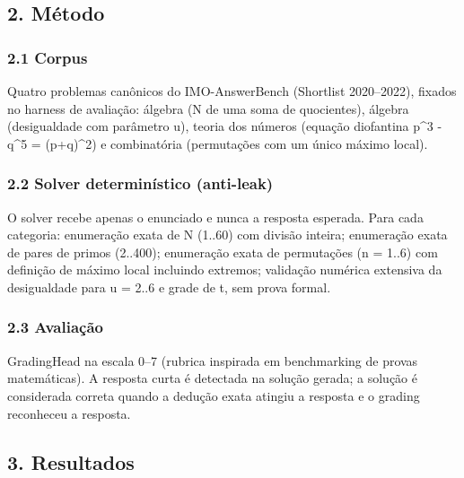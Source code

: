 \documentclass[11pt,a4paper]{article}
\begin{document}
\subsection{2. Método}\label{muxe9todo}

\subsubsection{2.1 Corpus}\label{corpus}

Quatro problemas canônicos do IMO-AnswerBench (Shortlist 2020--2022),
fixados no harness de avaliação: álgebra (N de uma soma de quocientes),
álgebra (desigualdade com parâmetro u), teoria dos números (equação
diofantina p\^{}3 - q\^{}5 = (p+q)\^{}2) e combinatória (permutações com
um único máximo local).

\subsubsection{2.2 Solver determinístico
(anti-leak)}\label{solver-determinuxedstico-anti-leak}

O solver recebe apenas o enunciado e nunca a resposta esperada. Para
cada categoria: enumeração exata de N (1..60) com divisão inteira;
enumeração exata de pares de primos (2..400); enumeração exata de
permutações (n = 1..6) com definição de máximo local incluindo extremos;
validação numérica extensiva da desigualdade para u = 2..6 e grade de t,
sem prova formal.

\subsubsection{2.3 Avaliação}\label{avaliauxe7uxe3o}

GradingHead na escala 0--7 (rubrica inspirada em benchmarking de provas
matemáticas). A resposta curta é detectada na solução gerada; a solução
é considerada correta quando a dedução exata atingiu a resposta e o
grading reconheceu a resposta.

\subsection{3. Resultados}\label{resultados}
\end{document}
